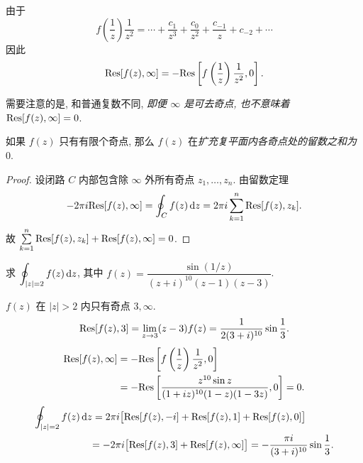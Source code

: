 由于
\[f\left(\frac1z\right)\frac1{z^2}=\cdots+\frac{c_1}{z^3}+\frac{c_0}{z^2}+\frac{c_{-1}}z+c_{-2}+\cdots\]
因此 
	\[{\mathrm{Res}}[f(z),\infty]=-{\mathrm{Res}}\left[f\left(\frac1z\right)\frac1{z^2},0\right].\]

需要注意的是, 和普通复数不同, \emph{即便 $\infty$ 是可去奇点, 也不意味着 ${\mathrm{Res}}[f(z),\infty]=0$}.

\begin{theorem}
	如果 $f(z)$ 只有有限个奇点, 那么 $f(z)$ 在\emph{扩充复平面内各奇点处的留数之和为 $0$}.
\end{theorem}

\begin{proof}
	设闭路 $C$ 内部包含除 $\infty$ 外所有奇点 $z_1,\dots,z_n$.
	由留数定理
		\[-2\pi i{\mathrm{Res}}[f(z),\infty]=\oint_C f(z)\,\mathrm{d} z=2\pi i\sum_{k=1}^n{\mathrm{Res}}[f(z),z_k].\]
	故 $\sum\limits_{k=1}^n {\mathrm{Res}}[f(z),z_k]+{\mathrm{Res}}[f(z),\infty]=0$.
\end{proof}

\begin{example}
	求 $\displaystyle\oint_{|z|=2}f(z)\,\mathrm{d} z$, 其中 $f(z)=\dfrac{\sin(1/z)}{(z+i)^{10}(z-1)(z-3)}$.
\end{example}

\begin{solution}
	$f(z)$ 在 $|z|>2$ 内只有奇点 $3,\infty$.
{
	\[{\mathrm{Res}}[f(z),3]=\lim_{z\to3}(z-3)f(z)=\frac1{2(3+i)^{10}}\sin\frac13.\]
}
	\begin{align*}
		{\mathrm{Res}}[f(z),\infty]&=-{\mathrm{Res}}\left[f\left(\frac1z\right)\frac1{z^2},0\right]\\
		&=-{\mathrm{Res}}\left[\frac{z^{10}\sin z}{(1+iz)^{10}(1-z)(1-3z)},0\right]=0.
	\end{align*}
{
	\begin{align*}
		\oint_{|z|=2}f(z)\,\mathrm{d} z
		&=2\pi i\bigl[{\mathrm{Res}}[f(z),-i]+{\mathrm{Res}}[f(z),1]+{\mathrm{Res}}[f(z),0]\bigr]\\
		&{=-2\pi i\bigl[{\mathrm{Res}}[f(z),3]+{\mathrm{Res}}[f(z),\infty]\bigr]=-\frac{\pi i}{(3+i)^{10}}\sin\frac13.}
	\end{align*}
}
\end{solution}

